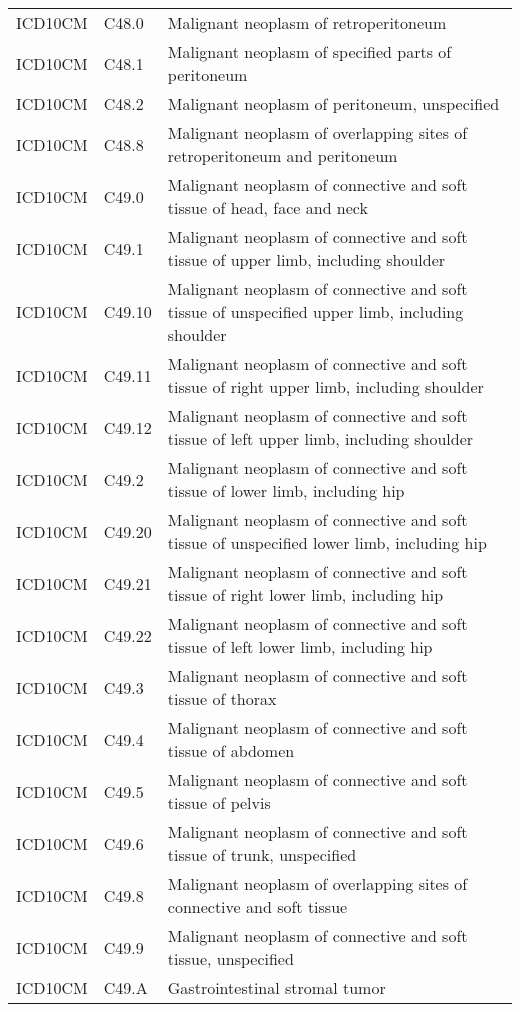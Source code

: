 \begin{longtable}{p{}p{}p{}}
  ICD10CM & C48.0 & Malignant neoplasm of retroperitoneum \\ 
  ICD10CM & C48.1 & Malignant neoplasm of specified parts of peritoneum \\ 
  ICD10CM & C48.2 & Malignant neoplasm of peritoneum, unspecified \\ 
  ICD10CM & C48.8 & Malignant neoplasm of overlapping sites of retroperitoneum and peritoneum \\ 
  ICD10CM & C49.0 & Malignant neoplasm of connective and soft tissue of head, face and neck \\ 
  ICD10CM & C49.1 & Malignant neoplasm of connective and soft tissue of upper limb, including shoulder \\ 
  ICD10CM & C49.10 & Malignant neoplasm of connective and soft tissue of unspecified upper limb, including shoulder \\ 
  ICD10CM & C49.11 & Malignant neoplasm of connective and soft tissue of right upper limb, including shoulder \\ 
  ICD10CM & C49.12 & Malignant neoplasm of connective and soft tissue of left upper limb, including shoulder \\ 
  ICD10CM & C49.2 & Malignant neoplasm of connective and soft tissue of lower limb, including hip \\ 
  ICD10CM & C49.20 & Malignant neoplasm of connective and soft tissue of unspecified lower limb, including hip \\ 
  ICD10CM & C49.21 & Malignant neoplasm of connective and soft tissue of right lower limb, including hip \\ 
  ICD10CM & C49.22 & Malignant neoplasm of connective and soft tissue of left lower limb, including hip \\ 
  ICD10CM & C49.3 & Malignant neoplasm of connective and soft tissue of thorax \\ 
  ICD10CM & C49.4 & Malignant neoplasm of connective and soft tissue of abdomen \\ 
  ICD10CM & C49.5 & Malignant neoplasm of connective and soft tissue of pelvis \\ 
  ICD10CM & C49.6 & Malignant neoplasm of connective and soft tissue of trunk, unspecified \\ 
  ICD10CM & C49.8 & Malignant neoplasm of overlapping sites of connective and soft tissue \\ 
  ICD10CM & C49.9 & Malignant neoplasm of connective and soft tissue, unspecified \\ 
  ICD10CM & C49.A & Gastrointestinal stromal tumor \\ 

\end{longtable}
